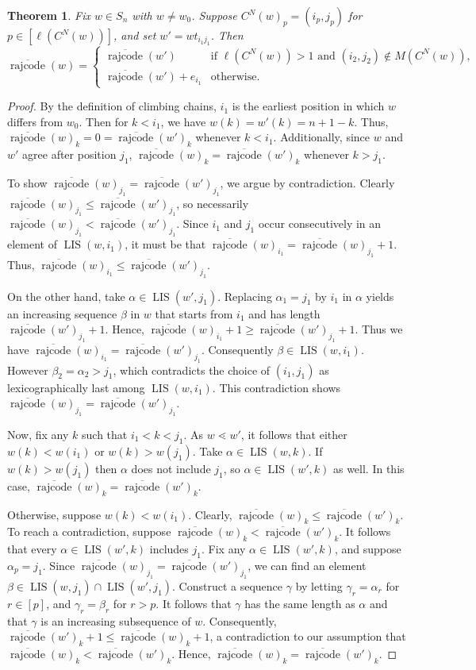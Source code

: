 \documentclass[11pt]{amsart}
\newtheorem{theorem}{Theorem}[section]
\theoremstyle{definition}
\theoremstyle{named}
\newcommand{\CN}{C^N}
\DeclareMathOperator{\rr}{\mathrm{rajcode}} %
\newcommand{\orr}{\overline{\rr}} %
\DeclareMathOperator{\LIS}{\mathrm{LIS}}
\begin{document}
	\begin{theorem}
		\label{thm:drecursion}
		Fix $w\in S_n$ with $w\neq w_0$. 
		Suppose $\CN(w)_p=(i_p,j_p)$ for $p\in [\ell(\CN(w))]$, and set $w'=wt_{i_1j_1}$. Then
		\[
		\orr(w) = 
		\begin{cases}
		\orr(w') &\mbox{if } \ell(\CN(w))>1 \mbox{ and }(i_2,j_2)\notin M(\CN(w)),\\
		\orr(w')+e_{i_1}&\mbox{otherwise}.
		\end{cases} 
		\]
	\end{theorem}
	\begin{proof}
		By the definition of climbing chains, $i_1$ is the earliest position in which $w$ differs from $w_0$. Then for $k<i_1$, we have $w(k) = w'(k) = n+1-k$. Thus, $\orr(w)_k=0=\orr(w')_k$ whenever $k<i_1$. Additionally, since $w$ and $w'$ agree after position $j_1$, $\orr(w)_k=\orr(w')_k$ whenever $k> j_1$.
		
		To show $\orr(w)_{j_1} = \orr(w')_{j_1}$, we argue by contradiction. Clearly $\orr(w)_{j_1}\leq \orr(w')_{j_1}$, so necessarily $\orr(w)_{j_1}<\orr(w')_{j_1}$. Since $i_1$ and $j_1$ occur consecutively in an element of $\LIS(w,i_1)$, it must be that $\orr(w)_{i_1}=\orr(w)_{j_1}+1$. Thus, $\orr(w)_{i_1}\leq \orr(w')_{j_1}$.
		
		On the other hand, take $\alpha\in\LIS(w',j_1)$. Replacing $\alpha_1=j_1$ by $i_1$ in $\alpha$ yields an increasing sequence $\beta$ in $w$ that starts from $i_1$ and has length $\orr(w')_{j_1}+1$. Hence, $\orr(w)_{i_1}+1\geq \orr(w')_{j_1}+1$. Thus we have $\orr(w)_{i_1}=\orr(w')_{j_1}$. Consequently $\beta\in \LIS(w,i_1)$. However $\beta_2=\alpha_2>j_1$, which contradicts the choice of $(i_1,j_1)$ as lexicographically last among $\LIS(w,i_1)$. This contradiction shows $\orr(w)_{j_1}=\orr(w')_{j_1}$.
		
		Now, fix any $k$ such that $i_1<k<j_1$. As $w\lessdot w'$, it follows that either $w(k)<w(i_1)$ or $w(k)>w(j_1)$. Take $\alpha\in\LIS(w,k)$. If $w(k)>w(j_1)$ then $\alpha$ does not include $j_1$, so $\alpha\in\LIS(w',k)$ as well. In this case, $\orr(w)_k=\orr(w')_k$.
		
		Otherwise, suppose $w(k)<w(i_1)$. Clearly, $\orr(w)_k\leq \orr(w')_k$. To reach a contradiction, suppose $\orr(w)_k<\orr(w')_k$. It follows that every $\alpha\in\LIS(w',k)$ includes $j_1$. Fix any $\alpha\in\LIS(w',k)$, and suppose $\alpha_p=j_1$. Since $\orr(w)_{j_1} = \orr(w')_{j_1}$, we can find an element $\beta\in \LIS(w,j_1)\cap \LIS(w',j_1)$. Construct a sequence $\gamma$ by letting $\gamma_r=\alpha_r$ for $r\in [p]$, and $\gamma_r=\beta_r$ for $r> p$. It follows that $\gamma$ has the same length as $\alpha$ and that $\gamma$ is an increasing subsequence of $w$. Consequently, $\orr(w')_k+1\leq \orr(w)_k+1$, a contradiction to our assumption that $\orr(w)_k<\orr(w')_k$. Hence, $\orr(w)_k=\orr(w')_k$.
		

\end{proof}
\end{document}
